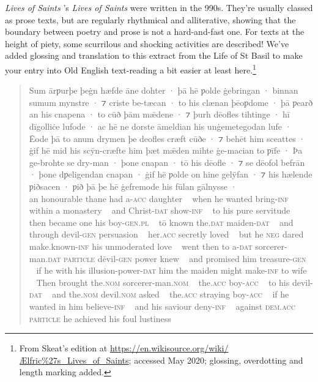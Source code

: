 \begin{texts}{\textit{Lives of Saints}}\label{OE-lives}
's \textit{Lives of Saints} were written in the 990s. They're usually classed as prose texts, but are regularly rhythmical and alliterative, showing that the boundary between poetry and prose is not a hard-and-fast one. For texts at the height of piety, some scurrilous and shocking activities are described! We've added glossing and translation to this extract from the Life of St Basil to make your entry into Old English text-reading a bit easier at least here.\footnote{From Skeat's edition at \url{https://en.wikisource.org/wiki/Ælfric\%27s_Lives_of_Saints}; accessed May 2020; glossing, overdotting and length marking added.}

\begin{quote}
    \gll Sum ārƿurþe þeġn hæfde āne dohter · þā hē ƿolde ġebringan · binnan sumum mynstre · ⁊ criste be-tæcan · to his clænan þēoƿdome · þā ƿearð an his cnapena · to cūð þām mǣdene · ⁊ þurh dēofles tihtinge · hī dīgolliċe lufode · ac hē ne dorste āmeldian his unġemetegodan lufe · Ēode þā to anum drymen þe deofles cræft cūðe · ⁠⁊ behēt him sceattes · ġif hē mid his scȳn-cræfte him þæt mǣden mihte ġe-macian to ƿīfe · Þa ge-brohte se dry-man · þone cnapan · tō his dēofle · ⁠⁊ se dēofol befrān · þone dƿeligendan cnapan · ġif hē ƿolde on hine gelȳfan · ⁊ his hælende ƿiðsacen · ƿið þā þe hē ġefremode his fūlan gālnysse ·\\
    an honourable thane had a-\textsc{acc} daughter ~ when he wanted bring-\textsc{inf} ~ within a monastery ~ and Christ-\textsc{dat} show-\textsc{inf} ~ to his pure servitude ~ then became one his boy-\textsc{gen.pl} ~ tō known the.\textsc{dat} maiden-\textsc{dat} ~ and through devil-\textsc{gen} persuasion ~ her.\textsc{acc} secretly loved ~ but he \textsc{neg} dared make.known-\textsc{inf} his unmoderated love ~ went then to a-\textsc{dat} sorcerer-man.\textsc{dat} \textsc{particle} dēvil-\textsc{gen} power knew ~ and promised him treasure-\textsc{gen} ~ if he with his illusion-power-\textsc{dat} him the maiden might make-\textsc{inf} to wife ~ Then brought the.\textsc{nom} sorcerer-man.\textsc{nom} ~ the.\textsc{acc} boy-\textsc{acc} ~ to his devil-\textsc{dat} ~ and the.\textsc{nom} devil.\textsc{nom} asked ~ the.\textsc{acc} straying boy-\textsc{acc} ~ if he wanted in him believe-\textsc{inf} ~ and his saviour deny-\textsc{inf} ~ against \textsc{dem.acc} \textsc{particle} he achieved his foul lustiness ~\\

\end{quote}
\end{texts}
